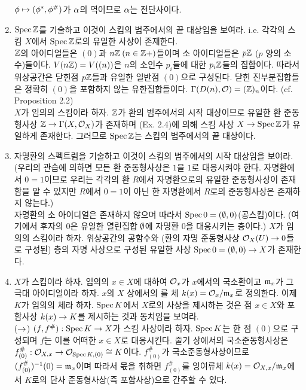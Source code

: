 \begin{enumerate}[label=\tb{2.\arabic*.},itemindent=0mm,itemsep=4mm]
	$\phi\mapsto(\phi^*,\phi^\#)$가 $\alpha$의 역이므로 $\alpha$는 전단사이다.
	\item $\operatorname{Spec}\mathbb Z$를 기술하고 이것이 스킴의 범주에서의 끝 대상임을 보여라.
	i.e. 각각의 스킴 $X$에서 $\operatorname{Spec}\mathbb Z$로의 유일한 사상이 존재한다.\\
	\sol $\mathbb Z$의 아이디얼들은 $(0)$과 $n\mathbb Z\:(n\in\mathbb Z+)$들이며 소 아이디얼들은 $p\mathbb Z$ ($p$ 양의 소수)들이다.
	$V(n\mathbb Z)=V((n))$은 $n$의 소인수 $p_i$들에 대한 $p_i\mathbb Z$들의 집합이다.
	따라서 위상공간은 닫힌점 $p\mathbb Z$들과 유일한 일반점 $(0)$으로 구성된다.
	닫힌 진부분집합들은 정확히 $(0)$을 포함하지 않는 유한집합들이다.
	$\Gamma(D(n),\mathcal{O})=(\mathbb Z)_n$이다. (cf. Proposition 2.2)\\
	$X$가 임의의 스킴이라 하자. $\mathbb Z$가 환의 범주에서의 시작 대상이므로 유일한 환 준동형사상 $\mathbb Z\rightarrow\Gamma(X,\mathcal{O}_X)$가 존재하며
	(Ex. 2.4)에 의해 스킴 사상 $X\rightarrow\operatorname{Spec}\mathbb Z$가 유일하게 존재한다. 그러므로 $\operatorname{Spec}\mathbb Z$는 스킴의 범주에서의 끝 대상이다.
	\item 자명환의 스펙트럼을 기술하고 이것이 스킴의 범주에서의 시작 대상임을 보여라.
	(우리의 관습에 의하면 모든 환 준동형사상은 $1$을 $1$로 대응시켜야 한다.
	자명환에서 $0=1$이므로 우리는 각각의 환 $R$에서 자명환으로의 유일한 준동형사상이 존재함을 알 수 있지만
	$R$에서 $0=1$이 아닌 한 자명환에서 $R$로의 준동형사상은 존재하지 않는다.)\\
	\sol 자명환의 소 아이디얼은 존재하지 않으며 따라서 $\operatorname{Spec} 0=(\emptyset,0)$(공스킴)이다.
	(여기에서 후자의 0은 유일한 열린집합 $\emptyset$에 자명환 0을 대응시키는 층이다.)
	$X$가 임의의 스킴이라 하자. 위상공간의 공함수와 (환의 자명 준동형사상 $\mathcal{O}_X(U)\rightarrow 0$들로 구성된)
	층의 자명 사상으로 구성된 유일한 사상 $\operatorname{Spec} 0=(\emptyset,0)\rightarrow X$가 존재한다.
	\item $X$가 스킴이라 하자. 임의의 $x\in X$에 대하여 $\mathcal{O}_x$가 $x$에서의 국소환이고 $\mathfrak{m}_x$가 그 극대 아이디얼이라 하자.
	$x$의 $X$ 상에서의 를 체 $k(x)=\mathcal{O}_x/\mathfrak{m}_x$로 정의한다. 이제 $K$가 임의의 체라 하자.
	$\operatorname{Spec} K$에서 $X$로의 사상을 제시하는 것은 점 $x\in X$와 포함사상 $k(x)\rightarrow K$를 제시하는 것과 동치임을 보여라.\\
	\sol ($\rightarrow$) $(f,f^\#):\operatorname{Spec} K\rightarrow X$가 스킴 사상이라 하자.
	$\operatorname{Spec} K$는 한 점 $(0)$으로 구성되며 $f$는 이를 어떠한 $x\in X$로 대응시킨다.
	줄기 상에서의 국소준동형사상은 $f_{(0)}^\#:\mathcal{O}_{X,x}\rightarrow\mathcal{O}_{\operatorname{Spec} K,(0)}\cong K$이다.
	$f_{(0)}^\#$가 국소준동형사상이므로 $(f_{(0)}^\#)^{-1}(0)=\mathfrak{m}_x$이며
	따라서 몫을 취하면 $f_{(0)}^\#$를 잉여류체 $k(x)=\mathcal{O}_{X,x}/\mathfrak{m}_x$에서
	$K$로의 단사 준동형사상(즉 포함사상)으로 간주할 수 있다.\\

\end{enumerate}
